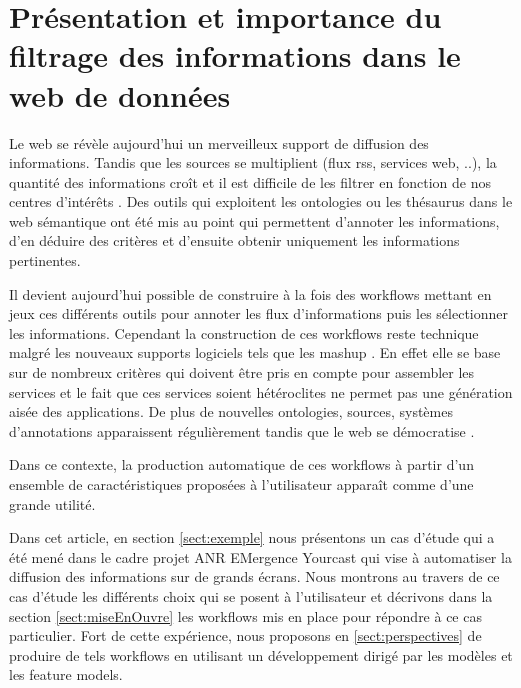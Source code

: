 \documentclass[]{easychair}
\newcommand{\comment}[4]{\par\noindent\hspace*{-0.5cm}{\parbox{\columnwidth}{\textbf{\color{#1}//#2[#3]:#4}}}\par}
\newcommand{\mi}[1]{\comment{blue}{}{#1}{MI}}
\begin{document}
\section{Présentation et importance du filtrage des informations dans le web de données}
\label{sect:introduction}

Le web se révèle aujourd'hui un merveilleux support de diffusion des informations. Tandis que les sources se multiplient (flux rss, services web, ..), la quantité des informations croît et il est difficile de les filtrer en fonction de nos centres d'intérêts  \cite{Bouzeghoub2005}. Des outils qui exploitent les ontologies ou les thésaurus dans le web sémantique \cite{Lee2001} ont été mis au point qui permettent d'annoter les informations, d'en déduire des critères et d'ensuite obtenir uniquement les informations pertinentes. 

Il devient aujourd'hui possible de construire à la fois des workflows mettant en jeux ces différents outils pour annoter les flux d'informations  puis les sélectionner les informations. 
Cependant la construction de ces workflows reste technique malgré les nouveaux supports logiciels tels que les mashup \cite{Floyd2007} \cite{Milanovic2004}. En effet elle se base sur de nombreux critères qui doivent être pris en compte pour assembler les services et le fait que ces services soient hétéroclites ne permet pas une génération aisée des applications. De plus de nouvelles ontologies, sources, systèmes d'annotations apparaissent régulièrement tandis que le web se démocratise \cite{Anderruthy2007} \cite{Bross2010}.

Dans ce contexte, la production automatique de ces workflows à partir d'un ensemble de caractéristiques proposées à l'utilisateur apparaît comme d'une grande utilité. 

Dans cet article, en section \ref{sect:exemple}  nous présentons un cas d'étude qui a été mené dans le cadre projet ANR EMergence Yourcast qui vise à automatiser la diffusion des informations sur de grands écrans. Nous montrons au travers de ce cas d'étude les différents choix qui se posent à l'utilisateur et décrivons dans la section \ref{sect:miseEnOuvre} les workflows  mis en place pour répondre à ce cas particulier. Fort de cette expérience, nous proposons en \ref{sect:perspectives} de produire de tels workflows en utilisant un développement dirigé par les modèles et les feature models. 
\end{document}

